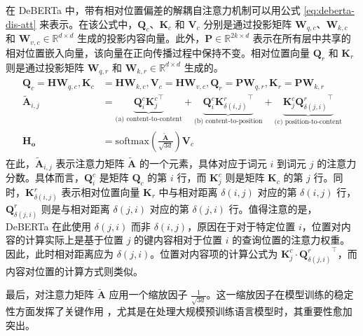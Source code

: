 在 DeBERTa 中，带有相对位置偏差的解耦自注意力机制可以用公式 \ref{eq:deberta-dis-att} 来表示。在该公式中，\(\mathbf{Q}_{c}\)、\(\mathbf{K}_{c}\) 和 \(\mathbf{V}_{c}\) 分别是通过投影矩阵 \(\mathbf{W}_{q,c}\)、\(\mathbf{W}_{k,c}\) 和 \(\mathbf{W}_{v,c} \in \mathbb{R}^{d \times d}\) 生成的投影内容向量。此外，\(\mathbf{P} \in \mathbb{R}^{2k \times d}\) 表示在所有层中共享的相对位置嵌入向量，该向量在正向传播过程中保持不变。相对位置向量 \(\mathbf{Q}_{r}\) 和 \(\mathbf{K}_{r}\) 则是通过投影矩阵 \(\mathbf{W}_{q,r}\) 和 \(\mathbf{W}_{k,r} \in \mathbb{R}^{d \times d}\) 生成的。
\begin{align} \label{eq:deberta-dis-att}
\begin{split}
    \mathbf{Q}_c = \mathbf{H} \mathbf{W}_{q,c}, 
    \mathbf{K}_c &= \mathbf{H} \mathbf{W}_{k,c}, 
    \mathbf{V}_c = \mathbf{H} \mathbf{W}_{v,c}, 
    \mathbf{Q}_r = \mathbf{P} \mathbf{W}_{q,r}, 
    \mathbf{K}_r = \mathbf{P} \mathbf{W}_{k,r} \\
    \tilde{\mathbf{A}}_{i,j} &= \underbrace{\mathbf{Q}^{c}_{i}{\mathbf{K}^{c}_{j}}^{\intercal}}_{\text{(a) content-to-content}}  
    + \underbrace{\mathbf{Q}^{c}_{i}{{\mathbf{K}^{r}_{\delta(i,j)}}^{\intercal}}}_{\text{(b) content-to-position}}
    + \underbrace{\mathbf{K}^{c}_{j}{{\mathbf{Q}^{r}_{\delta(j,i)}}^{\intercal}}}_{\text{(c) position-to-content}} \\
    \mathbf{H_o} &= \text{softmax}(\frac{\tilde{\mathbf{A}}}{\sqrt{3d}})\mathbf{V}_c
\end{split}
\end{align}
在此，\(\tilde{\mathbf{A}}_{i,j}\) 表示注意力矩阵 \(\tilde{\mathbf{A}}\) 的一个元素，具体对应于词元 \(i\) 到词元 \(j\) 的注意力分数。具体而言，\(\mathbf{Q}_{i}^{c}\) 是矩阵 \(\mathbf{Q}_{c}\) 的第 \(i\) 行，而 \(\mathbf{K}_{j}^{c}\) 则是矩阵 \(\mathbf{K}_{c}\) 的第 \(j\) 行。同时，\(\mathbf{K}_{\delta(i,j)}^{r}\) 表示相对位置向量 \(\mathbf{K}_{r}\) 中与相对距离 \(\delta(i,j)\) 对应的第 \(\delta(i,j)\) 行，\(\mathbf{Q}_{\delta(j,i)}^{r}\) 则是与相对距离 \(\delta(j,i)\) 对应的第 \(\delta(j,i)\) 行。值得注意的是，DeBERTa 在此使用 \(\delta(j,i)\) 而非 \(\delta(i,j)\)，原因在于对于特定位置 \(i\)，位置对内容的计算实际上是基于位置 \(j\) 的键内容相对于位置 \(i\) 的查询位置的注意力权重。因此，此时相对距离应为 \(\delta(j,i)\)。位置对内容项的计算公式为 \(\mathbf{K}_{j}^{c} \cdot {\mathbf{Q}_{\delta(j,i)}^{r}}^{\intercal}\)，而内容对位置的计算方式则类似。

最后，对注意力矩阵 \(\tilde{\mathbf{A}}\) 应用一个缩放因子 \(\frac{1}{\sqrt{3d}}\)。这一缩放因子在模型训练的稳定性方面发挥了关键作用 \cite{transformer}，尤其是在处理大规模预训练语言模型时，其重要性愈加突出。

